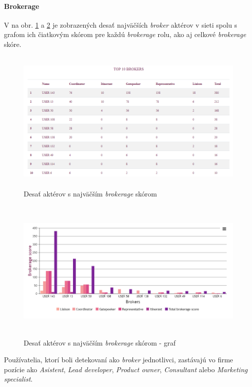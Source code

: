 \documentclass[slovak,master,public,dept460,male,cpdeclaration,oneside]{diploma}
\begin{document}
\paragraph{Brokerage}
\hfill \break
V na obr. \ref{analyza_jednotlivca_brokerage} a \ref{analyza_jednotlivca_brokerage_graph} je zobrazených desať najväčších \textit{broker} aktérov v sieti spolu s grafom ich čiatkovým skórom pre každú \textit{brokerage} rolu, ako aj celkové \textit{brokerage} skóre.

\begin{figure}[H]
\centering
\includegraphics[width=12cm, height=7cm]{figures/analyza_jednotlivca_brokerage}
\caption{Desať aktérov s najväčším \textit{brokerage} skórom}
\label{analyza_jednotlivca_brokerage}
\end{figure}


\begin{figure}[H]
\centering
\includegraphics[width=13cm, height=7cm]{figures/analyza_jednotlivca_brokerage_graph}
\caption{Desať aktérov s najväčším \textit{brokerage} skórom - graf}
\label{analyza_jednotlivca_brokerage_graph}
\end{figure}

Používatelia, ktorí boli detekovaní ako \textit{broker} jednotlivci, zastávajú vo firme pozície ako \textit{Asistent}, \textit{Lead developer}, \textit{Product owner}, \textit{Consultant} alebo \textit{Marketing specialist}.
\end{document}
